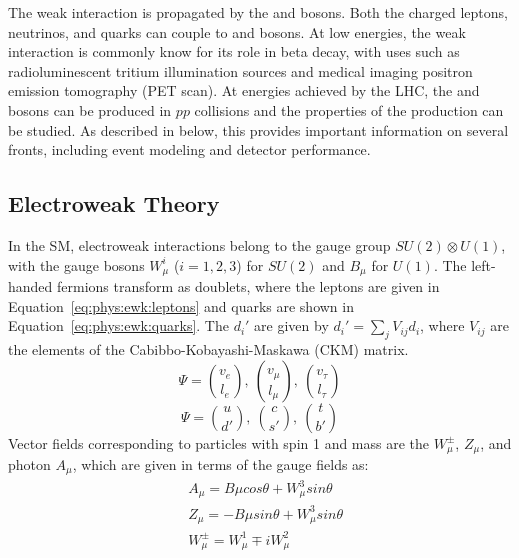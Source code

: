 The weak interaction is propagated by the \W and \Z bosons. Both the charged leptons, neutrinos, and quarks can couple to \W and \Z bosons.  At low energies, the weak interaction is commonly know for its role in beta decay, with uses such as radioluminescent tritium illumination sources and medical imaging positron emission tomography (PET scan).  At energies achieved by the LHC, the \W and \Z bosons can be produced in $pp$ collisions and the properties of the production can be studied. As described in below, this provides important information on several fronts, including event modeling and detector performance.



\subsection{Electroweak Theory}\label{ch:sm:ewk}
In the SM\cite{SMEWK1,SMEWK2,SMEWK3}, electroweak interactions belong to the gauge group $SU(2) \otimes U(1)$, with the gauge bosons $W_{\mu}^i$ ($i = 1,2,3$) for $SU(2)$ and  $B_{\mu}$ for $U(1)$.  The left-handed fermions transform as doublets, where the leptons are given in Equation~\ref{eq:phys:ewk:leptons} and quarks are shown in Equation~\ref{eq:phys:ewk:quarks}. The $d_i'$ are given by $d_i' = \sum_j V_{ij} d_i$, where $V_{ij}$ are the elements of the Cabibbo-Kobayashi-Maskawa (CKM) matrix\cite{ckm1,ckm2}.
\begin{equation}
  \Psi=\binom{v_e}{l_e},~\binom{v_{\mu}}{l_{\mu}},~\binom{v_{\tau}}{l_{\tau}}
  \label{eq:phys:ewk:leptons}
\end{equation}
\begin{equation}
  \Psi=\binom{u}{d'},~\binom{c}{s'},~\binom{t}{b'}
  \label{eq:phys:ewk:quarks}
\end{equation}
Vector fields corresponding to particles with spin 1 and mass are the $W_\mu^\pm$, $Z_\mu$, and photon $A_\mu$, which are given in terms of the gauge fields as:
\begin{equation}
\begin{aligned}
    &A_\mu = B\mu cos\theta + W^3_\mu sin\theta\\
&Z_\mu = -B\mu sin\theta + W^3_\mu sin\theta\\
&W_\mu^\pm = W_\mu^1 \mp i W^2_\mu
\end{aligned}
\label{eq:ewk_s1_particles}
\end{equation}

